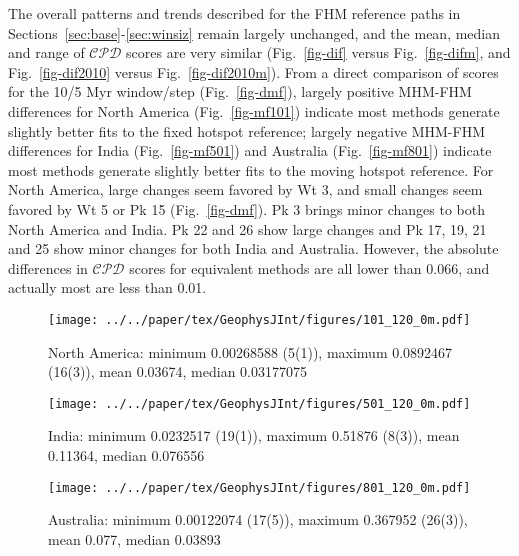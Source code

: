 The overall patterns and trends described for the FHM reference paths in
Sections~\ref{sec:base}-\ref{sec:winsiz} remain largely unchanged, and the mean,
median and range of $\mathcal{CPD}$ scores are very similar (Fig.~\ref{fig-dif}
versus Fig.~\ref{fig-difm}, and Fig.~\ref{fig-dif2010} versus
Fig.~\ref{fig-dif2010m}). From a direct comparison of scores for the 10/5 Myr
window/step (Fig.~\ref{fig-dmf}), largely positive MHM-FHM differences for North
America (Fig.~\ref{fig-mf101}) indicate most methods generate slightly better
fits to the fixed hotspot reference; largely negative MHM-FHM differences for
India (Fig.~\ref{fig-mf501}) and Australia (Fig.~\ref{fig-mf801}) indicate most
methods generate slightly better fits to the moving hotspot reference. For North
America, large changes seem favored by Wt 3, and small changes seem favored by
Wt 5 or Pk 15 (Fig.~\ref{fig-dmf}). Pk 3 brings minor changes to both North
America and India. Pk 22 and 26 show large changes and Pk 17, 19, 21 and 25 show
minor changes for both India and Australia. However, the absolute differences in
$\mathcal{CPD}$ scores for equivalent methods are all lower than 0.066, and
actually most are less than 0.01.

\begin{figure*}
	\centering
	\begin{subfigure}{1.01\textwidth}
		\texttt{[image: ../../paper/tex/GeophysJInt/figures/101\_120\_0m.pdf]}
		\caption{North America: minimum 0.00268588 (5(1)),
		maximum 0.0892467 (16(3)), mean 0.03674, median 0.03177075}\label{fig-na-difm}
	\end{subfigure}
	\vspace{.1em}
	\begin{subfigure}{1.01\textwidth}
		\texttt{[image: ../../paper/tex/GeophysJInt/figures/501\_120\_0m.pdf]}
		\caption{India: minimum 0.0232517 (19(1)), maximum 0.51876 (8(3)),
		mean 0.11364, median 0.076556}\label{fig-in-difm}
	\end{subfigure}
	\vspace{.1em}
	\begin{subfigure}{1.01\textwidth}
		\texttt{[image: ../../paper/tex/GeophysJInt/figures/801\_120\_0m.pdf]}
		\caption{Australia: minimum 0.00122074 (17(5)), maximum
		0.367952 (26(3)), mean 0.077, median 0.03893}\label{fig-au-difm}
	\end{subfigure}
	\caption[$\mathcal{CPD}$ of each plate's paleomagnetic APWPs vs its MHM
predicted APWP]{As Fig.~\ref{fig-dif}, here the reference path is predicted from
MHM\@. See the numbers of the picked paleopoles for methods in
Fig.~\ref{fig-dif}.}\label{fig-difm}
\end{figure*}

